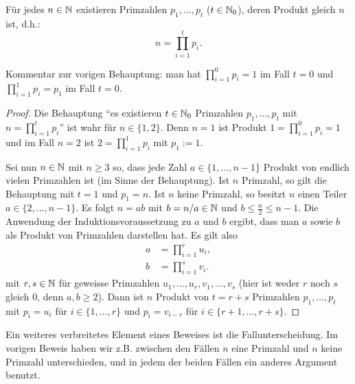 \begin{thm} 
	Für jedes $n \in \mathbb{N}$ existieren  Primzahlen $p_1,\ldots,p_t$ ($t \in \mathbb{N}_0$), deren Produkt gleich $n$ ist, d.h.:  
	\[
		n = \prod_{i=1}^t p_i.
	\] 
\end{thm} 

\begin{bem}
	Kommentar zur  vorigen Behauptung: man hat $\prod_{i=1}^0 p_i = 1$ im Fall $t=0$ und $\prod_{i=1}^1 p_i = p_1$ im Fall $t=0$. 
\end{bem} 


\begin{proof} 
	Die Behauptung ``es existieren $t \in \mathbb{N}_0$ Primzahlen $p_1,\ldots,p_t$ mit $n=\prod_{i=1}^t p_i$'' ist wahr für $n \in\{1,2\}$. Denn $n=1$ ist Produkt $1= \prod_{i=1}^0 p_i = 1$ und im Fall $n=2$ ist $2 = \prod_{i=1}^1 p_i$ mit $p_1:=1$.
	
	Sei nun $n \in \mathbb{N}$ mit $n \ge 3$ so, dass jede Zahl $a \in \{1,\ldots,n-1\}$ Produkt von endlich vielen Primzahlen ist (im Sinne der Behauptung). Ist $n$ Primzahl, so gilt die Behauptung mit $t=1$ und $p_1 = n$. Ist $n$ keine Primzahl, so besitzt $n$ einen Teiler $a \in \{2,\ldots,n-1\}$. Es folgt $n = a b$ mit $b = n / a \in \mathbb{N}$ und $b \le \frac{n}{2} \le n-1$. Die Anwendung der Induktionsvoraussetzung zu $a$ und $b$ ergibt, dass man $a$ sowie $b$ als Produkt von Primzahlen darstellen hat. Es gilt also 
	\begin{align*}
			a & = \prod_{i=1}^{r} u_i, 
		\\	b & = \prod_{i=1}^s  v_i.
	\end{align*} 
	mit $r, s \in \mathbb{N}$ für geweisse Primzahlen $u_1,\ldots,u_r,v_1,\ldots,v_s$ (hier ist weder $r$ noch $s$ gleich $0$, denn $a,b \ge 2$). 
	Dann ist $n$ Produkt von $t = r+s$ Primzahlen $p_1,\ldots,p_t$ mit $p_i = u_i$ für $i \in \{1,\ldots,r\}$ und $p_i = v_{i-r}$ für $i \in \{r+1,\ldots,r+s\}$. 
\end{proof} 

\begin{bem}[Fallunterscheidung] 
	Ein weiteres verbreitetes Element eines Beweises ist die Fallunterscheidung. Im vorigen Beweis haben wir z.B. zwischen den Fällen $n$ eine Primzahl und $n$ keine Primzahl unterschieden, und in  jedem der beiden Fällen ein anderes Argument benutzt. 
\end{bem} 


